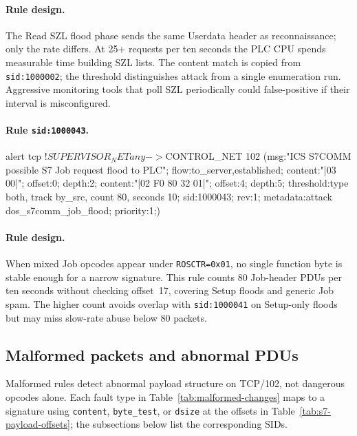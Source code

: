 \documentclass[../main.tex]{subfiles}
\begin{document}
\paragraph{Rule design.}
The Read SZL flood phase sends the same Userdata header as reconnaissance; only the rate differs. At 25+ requests per ten seconds the PLC CPU spends measurable time building SZL lists. The content match is copied from \texttt{sid:1000002}; the threshold distinguishes attack from a single enumeration run. Aggressive monitoring tools that poll SZL periodically could false-positive if their interval is misconfigured.

\paragraph{Rule \texttt{sid:1000043}.}
\begin{packetdump}
alert tcp !$SUPERVISOR_NET any -> $CONTROL_NET 102 (msg:"ICS S7COMM possible S7 Job request flood to PLC";
  flow:to_server,established; content:"|03 00|"; offset:0; depth:2;
  content:"|02 F0 80 32 01|"; offset:4; depth:5;
  threshold:type both, track by_src, count 80, seconds 10; sid:1000043; rev:1;
  metadata:attack dos_s7comm_job_flood; priority:1;)
\end{packetdump}

\paragraph{Rule design.}
When mixed Job opcodes appear under \texttt{ROSCTR=0x01}, no single function byte is stable enough for a narrow signature. This rule counts 80 Job-header PDUs per ten seconds without checking offset~17, covering Setup floods and generic Job spam. The higher count avoids overlap with \texttt{sid:1000041} on Setup-only floods but may miss slow-rate abuse below 80 packets.

\subsection{Malformed packets and abnormal PDUs}
\label{sec:rules-malformed}

Malformed rules detect abnormal payload structure on TCP/102, not dangerous opcodes alone. Each fault type in Table~\ref{tab:malformed-changes} maps to a signature using \texttt{content}, \texttt{byte\_test}, or \texttt{dsize} at the offsets in Table~\ref{tab:s7-payload-offsets}; the subsections below list the corresponding SIDs.
\end{document}
